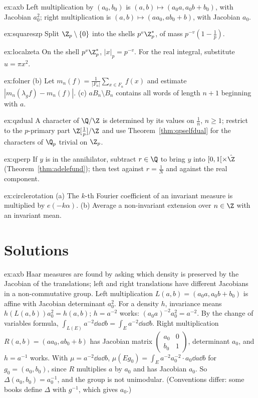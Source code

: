 \begin{hint}{ex:axb}
Left multiplication by $(a_0,b_0)$ is $(a,b)\mapsto(a_0a,a_0b+b_0)$, with Jacobian $a_0^2$; right multiplication is $(a,b)\mapsto(aa_0,ab_0+b)$, with Jacobian $a_0$.
\end{hint}
\begin{hint}{ex:squareszp}
Split $\Z_p\setminus\{0\}$ into the shells $p^v\Z_p^*$, of mass $p^{-v}(1-\frac1p)$.
\end{hint}
\begin{hint}{ex:localzeta}
On the shell $p^v\Z_p^*$, $|x|_p=p^{-v}$. For the real integral, substitute $u=\pi x^2$.
\end{hint}
\begin{hint}{ex:folner}
(b) Let $m_n(f)=\frac1{|F_n|}\sum_{x\in F_n}f(x)$ and estimate $|m_n(\lambda_gf)-m_n(f)|$. (c) $aB_n\setminus B_n$ contains all words of length $n+1$ beginning with $a$.
\end{hint}
\begin{hint}{ex:qzdual}
A character of $\Q/\Z$ is determined by its values on $\frac1{n}$, $n\ge1$; restrict to the $p$-primary part $\Z[\frac1p]/\Z$ and use Theorem~\ref{thm:qpselfdual} for the characters of
$\Q_p$ trivial on $\Z_p$.
\end{hint}
\begin{hint}{ex:qperp}
If $y$ is in the annihilator, subtract $r\in\Q$ to bring $y$ into $[0,1[\times\hat{\Z}$ (Theorem~\ref{thm:adelefund}); then test against $r=\frac1N$ and against the real component.
\end{hint}
\begin{hint}{ex:circlerotation}
(a) The $k$-th Fourier coefficient of an invariant measure is multiplied by $e(-k\alpha)$. (b) Average a non-invariant extension over $n\in\Z$ with an invariant mean.
\end{hint}

\section{Solutions}

\begin{solution}{ex:axb}
\idea Haar measures are found by asking which density is preserved by the Jacobian of the translations; left and right translations have different
Jacobians in a non-commutative group.
\writeup Left multiplication $L(a,b)=(a_0a,a_0b+b_0)$ is affine with Jacobian determinant $a_0^2$. For a density $h$, invariance means $h(L(a,b))a_0^2=h(a,b)$; $h=a^{-2}$
works: $(a_0a)^{-2}a_0^2=a^{-2}$. By the change of variables formula, $\int_{L(E)}a^{-2}\dd a\dd b=\int_Ea^{-2}\dd a\dd b$. Right multiplication $R(a,b)=(aa_0,ab_0+b)$ has
Jacobian matrix $\begin{pmatrix}a_0&0\\b_0&1\end{pmatrix}$, determinant $a_0$, and $h=a^{-1}$ works. With $\mu=a^{-2}\dd a\dd b$, $\mu(Eg_0)=\int_Ea^{-2}a_0^{-2}\cdot a_0\dd a\dd b$ for
$g_0=(a_0,b_0)$, since $R$ multiplies $a$ by $a_0$ and has Jacobian $a_0$. So $\Delta(a_0,b_0)=a_0^{-1}$, and the group is not unimodular. (Conventions differ: some books
define $\Delta$ with $g^{-1}$, which gives $a_0$.)
\end{solution}

